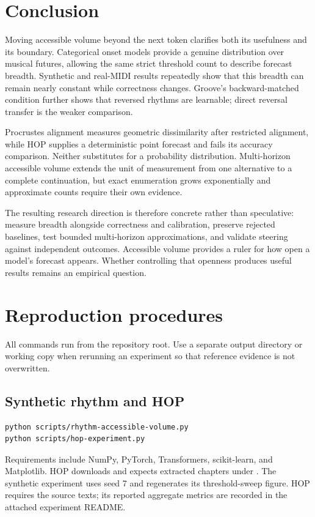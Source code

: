 \documentclass[11pt,a4paper]{article}
\begin{document}
\section{Conclusion}
Moving accessible volume beyond the next token clarifies both its usefulness and its boundary. Categorical onset models provide a genuine distribution over musical futures, allowing the same strict threshold count to describe forecast breadth. Synthetic and real-MIDI results repeatedly show that this breadth can remain nearly constant while correctness changes. Groove's backward-matched condition further shows that reversed rhythms are learnable; direct reversal transfer is the weaker comparison.

Procrustes alignment measures geometric dissimilarity after restricted alignment, while HOP supplies a deterministic point forecast and fails its accuracy comparison. Neither substitutes for a probability distribution. Multi-horizon accessible volume extends the unit of measurement from one alternative to a complete continuation, but exact enumeration grows exponentially and approximate counts require their own evidence.

The resulting research direction is therefore concrete rather than speculative: measure breadth alongside correctness and calibration, preserve rejected baselines, test bounded multi-horizon approximations, and validate steering against independent outcomes. Accessible volume provides a ruler for how open a model's forecast appears. Whether controlling that openness produces useful results remains an empirical question.

\appendix
\section{Reproduction procedures}
All commands run from the repository root. Use a separate output directory or working copy when rerunning an experiment so that reference evidence is not overwritten.

\subsection{Synthetic rhythm and HOP}
\begin{lstlisting}
python scripts/rhythm-accessible-volume.py
python scripts/hop-experiment.py
\end{lstlisting}
Requirements include NumPy, PyTorch, Transformers, scikit-learn, and Matplotlib. HOP downloads  and expects extracted chapters under . The synthetic experiment uses seed 7 and regenerates its threshold-sweep figure. HOP requires the source texts; its reported aggregate metrics are recorded in the attached experiment README.
\end{document}
